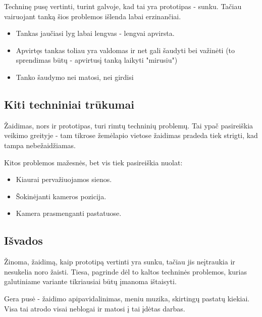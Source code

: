 Techninę pusę vertinti, turint galvoje, kad tai yra prototipas - sunku.
Tačiau vairuojant tanką šios problemos išlenda labai erzinančiai.
	\begin{itemize}
		\item Tankas jaučiasi lyg labai lengvas - lengvai apvirsta.
		\item Apvirtęs tankas toliau yra valdomas ir net gali šaudyti bei važinėti (to sprendimas būtų - apvirtusį tanką laikyti "mirusiu")
		\item Tanko šaudymo nei matosi, nei girdisi
	\end{itemize}
		
\subsection{Kiti techniniai trūkumai}
	Žaidimas, nors ir prototipas, turi rimtų techninių problemų.
	Tai ypač pasireiškia veikimo greityje - tam tikrose žemėlapio vietose žaidimas pradeda tiek strigti, kad tampa nebežaidžiamas.
	
	Kitos problemos mažesnės, bet vis tiek pasireiškia nuolat:
	\begin{itemize}
		\item Kiaurai pervažiuojamos sienos.
		\item Šokinėjanti kameros pozicija.
		\item Kamera prasmenganti pastatuose.
	\end{itemize}
	
\subsection{Išvados}
	Žinoma, žaidimą, kaip prototipą vertinti yra sunku, tačiau jis neįtraukia ir nesukelia noro žaisti.
	Tiesa, pagrinde dėl to kaltos techninės problemos, kurias galutiniame variante tikriausiai būtų įmanoma ištaisyti.
	
	Gera pusė - žaidimo apipavidalinimas, meniu muzika, skirtingų pastatų kiekiai.
	Visa tai atrodo visai neblogai ir matosi į tai įdėtas darbas.
	